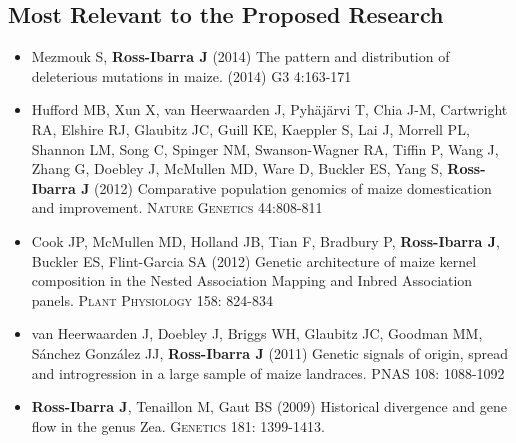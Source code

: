 \subsection*{Most Relevant to the Proposed Research}

\begin{itemize} \setlength{\itemsep}{0pt} \setlength{\parskip}{2pt} \setlength{\parsep}{0pt}




\item Mezmouk S, {\bf Ross-Ibarra J} (2014) The pattern and distribution of deleterious mutations in maize. (2014) \textsc{G3} 4:163-171

\item Hufford MB, Xun X, van Heerwaarden J, Pyh\"aj\"arvi T, Chia J-M, Cartwright RA, Elshire RJ, Glaubitz JC, Guill KE, Kaeppler S, Lai J, Morrell PL, Shannon LM, Song C, Spinger NM, Swanson-Wagner RA, Tiffin P, Wang J, Zhang G, Doebley J, McMullen MD, Ware D, Buckler ES, Yang S, {\bf Ross-Ibarra J} (2012) Comparative population genomics of maize domestication and improvement. \textsc{Nature Genetics} 44:808-811

\item Cook JP, McMullen MD, Holland JB, Tian F, Bradbury P, {\bf Ross-Ibarra J}, Buckler ES, Flint-Garcia SA (2012) Genetic architecture of maize kernel composition in the Nested Association Mapping and Inbred Association panels.  \textsc{Plant Physiology} 158: 824-834

\item {van Heerwaarden J}, Doebley J, Briggs WH, Glaubitz JC, Goodman MM, S\'{a}nchez Gonz\'{a}lez JJ, {\bf Ross-Ibarra J} (2011) Genetic signals of origin, spread and introgression in a large sample of maize landraces. PNAS 108: 1088-1092

\item {\bf Ross-Ibarra J}, Tenaillon M, Gaut BS (2009) Historical divergence and gene flow in the genus Zea.  \textsc{Genetics} 181: 1399-1413.


\end{itemize}

